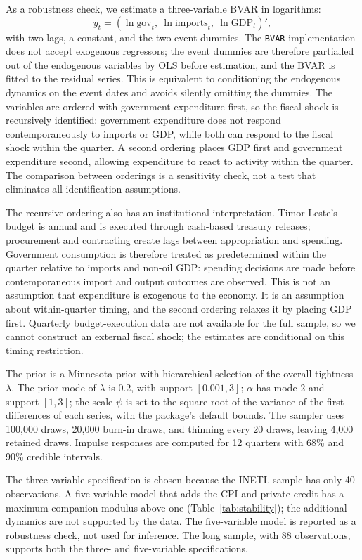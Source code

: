 \documentclass[11pt,a4paper]{article}
\begin{document}
As a robustness check, we estimate a three-variable BVAR in logarithms:
\[
y_t = \left(\ln \text{gov}_t,\ \ln \text{imports}_t,\ \ln \text{GDP}_t\right)' ,
\]
with two lags, a constant, and the two event dummies. The \texttt{BVAR} implementation does not accept exogenous regressors; the event dummies are therefore partialled out of the endogenous variables by OLS before estimation, and the BVAR is fitted to the residual series. This is equivalent to conditioning the endogenous dynamics on the event dates and avoids silently omitting the dummies. The variables are ordered with government expenditure first, so the fiscal shock is recursively identified: government expenditure does not respond contemporaneously to imports or GDP, while both can respond to the fiscal shock within the quarter. A second ordering places GDP first and government expenditure second, allowing expenditure to react to activity within the quarter. The comparison between orderings is a sensitivity check, not a test that eliminates all identification assumptions.

The recursive ordering also has an institutional interpretation. Timor-Leste's budget is annual and is executed through cash-based treasury releases; procurement and contracting create lags between appropriation and spending. Government consumption is therefore treated as predetermined within the quarter relative to imports and non-oil GDP: spending decisions are made before contemporaneous import and output outcomes are observed. This is not an assumption that expenditure is exogenous to the economy. It is an assumption about within-quarter timing, and the second ordering relaxes it by placing GDP first. Quarterly budget-execution data are not available for the full sample, so we cannot construct an external fiscal shock; the estimates are conditional on this timing restriction.

The prior is a Minnesota prior with hierarchical selection of the overall tightness $\lambda$. The prior mode of $\lambda$ is 0.2, with support $[0.001,3]$; $\alpha$ has mode 2 and support $[1,3]$; the scale $\psi$ is set to the square root of the variance of the first differences of each series, with the package's default bounds. The sampler uses 100,000 draws, 20,000 burn-in draws, and thinning every 20 draws, leaving 4,000 retained draws. Impulse responses are computed for 12 quarters with 68\% and 90\% credible intervals.

The three-variable specification is chosen because the INETL sample has only 40 observations. A five-variable model that adds the CPI and private credit has a maximum companion modulus above one (Table~\ref{tab:stability}); the additional dynamics are not supported by the data. The five-variable model is reported as a robustness check, not used for inference. The long sample, with 88 observations, supports both the three- and five-variable specifications.
\end{document}
